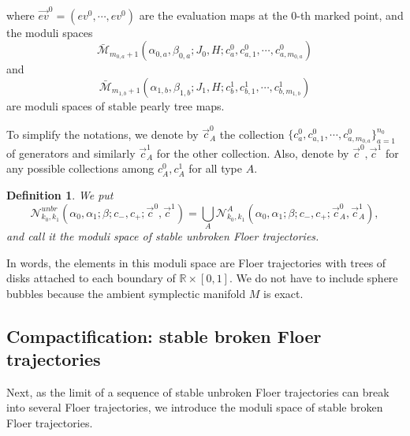 \documentclass{amsart}
\newtheorem{definition}[theorem]{Definition}
\numberwithin{equation}{section}
\numberwithin{figure}{section}
\begin{document}
where $\vec{ev}^{0} = (ev^{0}, \cdots, ev^{0})$ are the evaluation maps at the $0$-th marked point, and the moduli spaces 
\begin{equation*}
\bar{\mathcal{M}}_{m_{0, a}+1}(\alpha_{0, a}, \beta_{0, a}; J_{0}, H; c^{0}_{a}, c^{0}_{a, 1}, \cdots, c^{0}_{a, m_{0, a}})
\end{equation*}
and
\begin{equation*}
\bar{\mathcal{M}}_{m_{1, b}+1}(\alpha_{1, b}, \beta_{1,b}; J_{1}, H; c^{1}_{b}, c^{1}_{b, 1}, \cdots, c^{1}_{b, m_{1, b}})
\end{equation*}
are moduli spaces of stable pearly tree maps. \par
	To simplify the notations, we denote by $\vec{c}^{0}_{A}$ the collection $\{c^{0}_{a}, c^{0}_{a, 1}, \cdots, c^{0}_{a, m_{0, a}}\}_{a=1}^{n_{0}}$ of generators and similarly $\vec{c}^{1}_{A}$ for the other collection. Also, denote by $\vec{c}^{0}, \vec{c}^{1}$ for any possible collections among $c^{0}_{A}, c^{1}_{A}$ for all type $A$. \par

\begin{definition}
	We put
\begin{equation}
\mathcal{N}^{unbr}_{k_{0}, k_{1}}(\alpha_{0}, \alpha_{1}; \beta; c_{-}, c_{+}; \vec{c}^{0}, \vec{c}^{1})
= \bigcup_{A} \mathcal{N}^{A}_{k_{0}, k_{1}}(\alpha_{0}, \alpha_{1}; \beta; c_{-}, c_{+}; \vec{c}^{0}_{A}, \vec{c}^{1}_{A}),
\end{equation}
and call it the moduli space of stable unbroken Floer trajectories.
\end{definition}

	In words, the elements in this moduli space are Floer trajectories with trees of disks attached to each boundary of $\mathbb{R} \times [0, 1]$. We do not have to include sphere bubbles because the ambient symplectic manifold $M$ is exact. \par


\subsection{Compactification: stable broken Floer trajectories}
	Next, as the limit of a sequence of stable unbroken Floer trajectories can break into several Floer trajectories, we introduce the moduli space of stable broken Floer trajectories. \par
	
\end{document}
